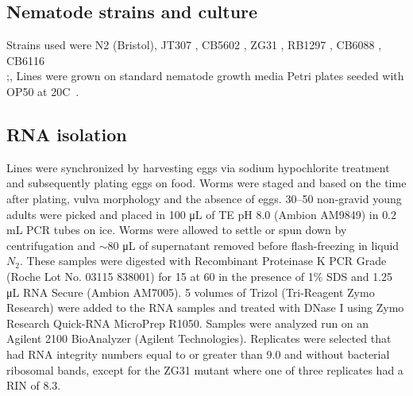 \subsection*{Nematode strains and culture}
Strains used were N2 (Bristol),
JT307 ,
CB5602 ,
ZG31 ,
RB1297 ,
CB6088 ,
CB6116\\ %
;,
Lines were grown on standard nematode growth media Petri plates seeded with
OP50 \ecol{} at 20\degree{}C~\citep{Brenner1974}.

\subsection*{RNA isolation}
Lines were synchronized by harvesting eggs via sodium hypochlorite treatment and
subsequently plating eggs on food. Worms were staged and based on the time after
plating, vulva morphology and the absence of eggs. 30--50 non-gravid young
adults were picked and placed in 100 \si{\micro\liter} of TE pH 8.0 (Ambion
AM9849) in $0.2$ \si{\milli\liter} PCR tubes on ice. Worms were allowed to
settle or spun down by centrifugation and $\sim 80$ \si{\micro\liter} of
supernatant removed before flash-freezing in liquid $N_2$. These samples were
digested with Recombinant Proteinase K PCR Grade (Roche Lot No. 03115 838001)
for 15 \si{\min} at 60\degree{} in the presence of 1\% SDS and 1.25
\si{\micro\liter} RNA Secure (Ambion AM7005). 5 volumes of Trizol (Tri-Reagent
Zymo Research) were added to the RNA samples and treated with DNase I using Zymo
Research Quick-RNA MicroPrep R1050. Samples were analyzed run on an Agilent 2100
BioAnalyzer (Agilent Technologies). Replicates were selected that had RNA
integrity numbers equal to or greater than 9.0 and without bacterial ribosomal
bands, except for the ZG31 mutant where one of three replicates had a RIN of
8.3.

